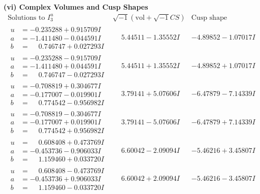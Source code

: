 \documentclass[1p]{elsarticle_modified}
\theoremstyle{definition}
\newcommand{\I}{\sqrt{-1}}
\begin{document}
\newpage\flushleft \textbf{(vi) Complex Volumes and Cusp Shapes}
$$\begin{array}{c|c|c}  
\text{Solutions to }I^u_{3}& \I (\text{vol} + \sqrt{-1}CS) & \text{Cusp shape}\\
 \hline 
\begin{aligned}
u &= -0.235288 + 0.915709 I \\
a &= -1.411480 - 0.044591 I \\
b &= \phantom{-}0.746747 + 0.027293 I\end{aligned}
 & \phantom{-}5.44511 - 1.35552 I & -4.89852 - 1.07017 I \\ \hline\begin{aligned}
u &= -0.235288 - 0.915709 I \\
a &= -1.411480 + 0.044591 I \\
b &= \phantom{-}0.746747 - 0.027293 I\end{aligned}
 & \phantom{-}5.44511 + 1.35552 I & -4.89852 + 1.07017 I \\ \hline\begin{aligned}
u &= -0.708819 + 0.304677 I \\
a &= -0.177007 - 0.019901 I \\
b &= \phantom{-}0.774542 - 0.956982 I\end{aligned}
 & \phantom{-}3.79141 + 5.07606 I & -6.47879 - 7.14339 I \\ \hline\begin{aligned}
u &= -0.708819 - 0.304677 I \\
a &= -0.177007 + 0.019901 I \\
b &= \phantom{-}0.774542 + 0.956982 I\end{aligned}
 & \phantom{-}3.79141 - 5.07606 I & -6.47879 + 7.14339 I \\ \hline\begin{aligned}
u &= \phantom{-}0.608408 + 0.473769 I \\
a &= -0.453736 - 0.906033 I \\
b &= \phantom{-}1.159460 + 0.033720 I\end{aligned}
 & \phantom{-}6.60042 - 2.09094 I & -5.46216 + 3.45807 I \\ \hline\begin{aligned}
u &= \phantom{-}0.608408 - 0.473769 I \\
a &= -0.453736 + 0.906033 I \\
b &= \phantom{-}1.159460 - 0.033720 I\end{aligned}
 & \phantom{-}6.60042 + 2.09094 I & -5.46216 - 3.45807 I \\ \hline\begin{aligned}

\end{aligned}
\end{array}$$
\end{document}
